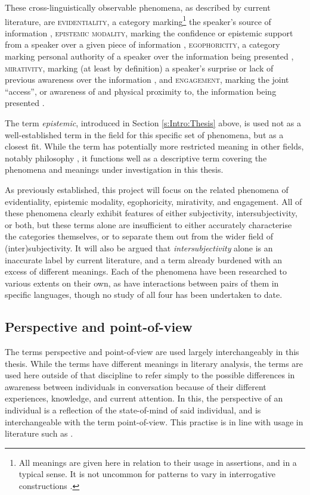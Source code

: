 These cross-linguistically observable phenomena, as described by current literature, are \textsc{evidentiality}, a category marking\footnote{All meanings are given here in relation to their usage in assertions, and in a typical sense. It is not uncommon for patterns to vary in interrogative constructions \cite{Aikhenvald2018Intro}.} the speaker's source of information \cite{SanRoque2019Evidentiality}, \textsc{epistemic modality}, marking the confidence or epistemic support from a speaker over a given piece of information \cite{Boye2012}, \textsc{egophoricity}, a category marking personal authority of a speaker over the information being presented \cite{EgoIntro}, \textsc{mirativity}, marking (at least by definition) a speaker's surprise or lack of previous awareness over the information \cite{DeLancey2012}, and \textsc{engagement}, marking the joint ``access'', or awareness of and physical proximity to, the information being presented \cites{EvansBergqvistSanRoque2018a}{EvansBergqvistSanRoque2018b}.

The term \textit{epistemic}, introduced in Section \ref{s:Intro:Thesis} above, is used not as a well-established term in the field for this specific set of phenomena, but as a closest fit. While the term has potentially more restricted meaning in other fields, notably philosophy , it functions well as a descriptive term covering the phenomena and meanings under investigation in this thesis. 

As previously established, this project will focus on the related phenomena of evidentiality, epistemic modality, egophoricity, mirativity, and engagement. All of these phenomena clearly exhibit features of either subjectivity, intersubjectivity, or both, but these terms alone are insufficient to either accurately characterise the categories themselves, or to separate them out from the wider field of (inter)subjectivity. It will also be argued that \textit{intersubjectivity} alone is an inaccurate label by current literature, and a term already burdened with an excess of different meanings. Each of the phenomena have been researched to various extents on their own, as have interactions between pairs of them in specific languages, though no study of all four has been undertaken to date.

\subsection{Perspective and point-of-view}\label{ss:Intro:PerspPOVDefs}
The terms perspective and point-of-view are used largely interchangeably in this thesis. While the terms have different meanings in literary analysis, the terms are used here outside of that discipline to refer simply to the possible differences in awareness between individuals in conversation because of their different experiences, knowledge, and current attention. In this, the perspective of an individual is a reflection of the state-of-mind of said individual, and is interchangeable with the term point-of-view. This practise is in line with usage in literature such as . 

